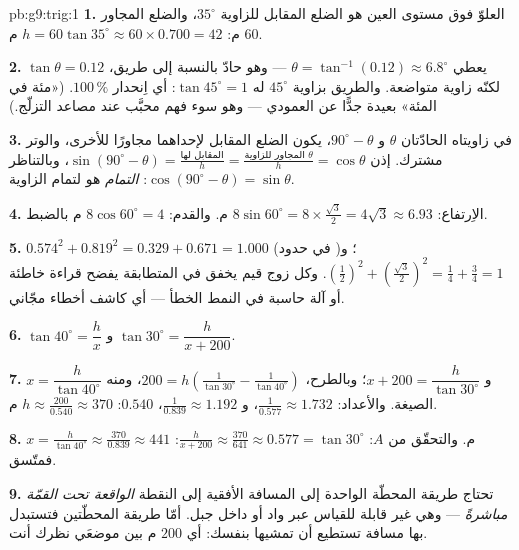 \begin{solution}{pb:g9:trig:1}
\textbf{1.} العلوّ فوق مستوى العين هو الضلع المقابل للزاوية
$35^\circ$، والضلع المجاور $60$ م:
$h = 60 \tan 35^\circ \approx 60 \times 0.700 = 42$ م.

\textbf{2.} $\tan\theta = 0.12$ يعطي
$\theta = \tan^{-1}(0.12) \approx 6.8^\circ$ --- وهو حادّ
بالنسبة إلى طريق، لكنّه زاوية متواضعة. والطريق بزاوية
$45^\circ$ له $\tan 45^\circ = 1$: أي اِنحدار $100\,\%$. («مئة
في المئة» بعيدة جدًّا عن العمودي --- وهو سوء فهم محبَّب عند
مصاعد التزلّج.)

\textbf{3.} في  زاويتاه الحادّتان $\theta$
و $90^\circ - \theta$، يكون الضلع المقابل لإحداهما مجاورًا
للأخرى، والوتر مشترك. إذن
$\sin(90^\circ - \theta) = \frac{\text{المقابل لها}}{h} =
\frac{\text{المجاور للزاوية }\theta}{h} = \cos\theta$،
وبالتناظر $\cos(90^\circ - \theta) = \sin\theta$: 
\emph{التمام} هو  لتمام الزاوية.

\textbf{4.} الاِرتفاع: $8 \sin 60^\circ = 8 \times
\frac{\sqrt3}{2} = 4\sqrt3 \approx 6.93$ م. والقدم:
$8 \cos 60^\circ = 4$ م بالضبط.

\textbf{5.} $0.574^2 + 0.819^2 = 0.329 + 0.671 = 1.000$ (في حدود
)؛ و $\left(\frac12\right)^2 +
\left(\frac{\sqrt3}{2}\right)^2 = \frac14 + \frac34 = 1$. وكل
زوج قيم يخفق في المتطابقة يفضح قراءة خاطئة أو آلة حاسبة في
النمط الخطأ --- أي كاشف أخطاء مجّاني.

\textbf{6.} $\tan 40^\circ = \dfrac hx$
و $\tan 30^\circ = \dfrac{h}{x + 200}$.

\textbf{7.} $x = \dfrac{h}{\tan 40^\circ}$
و $x + 200 = \dfrac{h}{\tan 30^\circ}$؛ وبالطرح،
$200 = h\left(\frac{1}{\tan 30^\circ} -
\frac{1}{\tan 40^\circ}\right)$، ومنه الصيغة. والأعداد:
$\frac{1}{0.577} \approx 1.732$، و $\frac{1}{0.839} \approx
1.192$،  $0.540$:
$h \approx \frac{200}{0.540} \approx 370$ م.

\textbf{8.} $x = \frac{h}{\tan 40^\circ} \approx
\frac{370}{0.839} \approx 441$ م. والتحقّق من $A$:
$\frac{h}{x + 200} \approx \frac{370}{641} \approx 0.577 =
\tan 30^\circ$: فمتّسق.

\textbf{9.} تحتاج طريقة المحطّة الواحدة إلى المسافة الأفقية إلى
النقطة \emph{الواقعة تحت القمّة مباشرةً} --- وهي غير قابلة
للقياس عبر واد أو داخل جبل. أمّا طريقة المحطّتين فتستبدل بها
مسافة تستطيع أن تمشيها بنفسك: أي $200$ م بين موضعَي نظرك أنت.


\end{solution}

